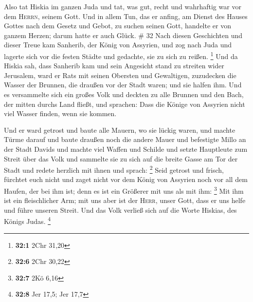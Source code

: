  Also tat Hiskia im ganzen Juda und tat, was gut, recht
und wahrhaftig war vor dem \textsc{Herrn}, seinem Gott. 
Und in allem Tun, das er anfing, am Dienst des Hauses Gottes nach dem
Gesetz und Gebot, zu suchen seinen Gott, handelte er von ganzem Herzen;
darum hatte er auch Glück. \# 32  Nach diesen Geschichten
und dieser Treue kam Sanherib, der König von Assyrien, und zog nach Juda
und lagerte sich vor die festen Städte und gedachte, sie zu sich zu
reißen. \footnote{\textbf{32:1} 2Chr 31,20}  Und da Hiskia
sah, dass Sanherib kam und sein Angesicht stand zu streiten wider
Jerusalem,  ward er Rats mit seinen Obersten und
Gewaltigen, zuzudecken die Wasser der Brunnen, die draußen vor der Stadt
waren; und sie halfen ihm.  Und es versammelte sich ein
großes Volk und deckten zu alle Brunnen und den Bach, der mitten durchs
Land fließt, und sprachen: Dass die Könige von Assyrien nicht viel
Wasser finden, wenn sie kommen.

 Und er ward getrost und baute alle Mauern, wo sie lückig
waren, und machte Türme darauf und baute draußen noch die andere Mauer
und befestigte Millo an der Stadt Davids und machte viel Waffen und
Schilde  und setzte Hauptleute zum Streit über das Volk
und sammelte sie zu sich auf die breite Gasse am Tor der Stadt und
redete herzlich mit ihnen und sprach: \footnote{\textbf{32:6} 2Chr 30,22}
 Seid getrost und frisch, fürchtet euch nicht und zaget
nicht vor dem König von Assyrien noch vor all dem Haufen, der bei ihm
ist; denn es ist ein Größerer mit uns als mit ihm: \footnote{\textbf{32:7}
  2Kö 6,16}  Mit ihm ist ein fleischlicher Arm; mit uns
aber ist der \textsc{Herr}, unser Gott, dass er uns helfe und führe
unseren Streit. Und das Volk verließ sich auf die Worte Hiskias, des
Königs Judas. \footnote{\textbf{32:8} Jer 17,5; Jer 17,7}

